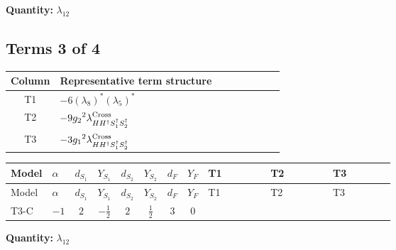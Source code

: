\documentclass[8pt]{article}
\begin{document}
\begin{landscape}
\begin{longtable}{@{}llcccccc >{\raggedright\arraybackslash}p{0.21\linewidth} >{\raggedright\arraybackslash}p{0.21\linewidth} >{\raggedright\arraybackslash}p{0.21\linewidth}@{}}
\midrule
\bottomrule
\end{longtable}
\clearpage
\noindent\textbf{Quantity: }$\lambda_{12}$\par\smallskip
\subsection*{Terms 3 of 4}
\begin{center}
\begin{tabular}{@{}c >{\raggedright\arraybackslash}p{0.82\linewidth}@{}}
\toprule
Column & Representative term structure \\
\midrule
T1 & \(\displaystyle -6 \left({\lambda_{8}}\right)^{*} \left({\lambda_5}\right)^{*}\) \\
\midrule
T2 & \(\displaystyle -9 {g_2}^2 {\lambda_{H H^\dagger S_1^\dagger S_2^\dagger}^{\rm Cross}}\) \\
\midrule
T3 & \(\displaystyle -3 {g_1}^2 {\lambda_{H H^\dagger S_1^\dagger S_2^\dagger}^{\rm Cross}}\) \\
\midrule
\bottomrule
\end{tabular}
\end{center}
\smallskip
\tiny
\begin{longtable}{@{}llcccccc >{\raggedright\arraybackslash}p{0.21\linewidth} >{\raggedright\arraybackslash}p{0.21\linewidth} >{\raggedright\arraybackslash}p{0.21\linewidth}@{}}
\toprule
Model & $\alpha$ & $d_{S_1}$ & $Y_{S_1}$ & $d_{S_2}$ & $Y_{S_2}$ & $d_F$ & $Y_F$ & T1 & T2 & T3 \\
\midrule
\endfirsthead
\toprule
Model & $\alpha$ & $d_{S_1}$ & $Y_{S_1}$ & $d_{S_2}$ & $Y_{S_2}$ & $d_F$ & $Y_F$ & T1 & T2 & T3 \\
\midrule
\endhead
T3-C & $-1$ & $2$ & $-\frac{1}{2}$ & $2$ & $\frac{1}{2}$ & $3$ & $0$ & \scriptsize\adjustbox{max width=\linewidth}{$\begin{gathered} -6 \left({\lambda_{8}}\right)^{*} \left({\lambda_5}\right)^{*}\end{gathered}$} & \scriptsize\adjustbox{max width=\linewidth}{$\begin{gathered} -9 {g_2}^2 {\lambda_{H H^\dagger S_1^\dagger S_2^\dagger}^{\rm Cross}}\end{gathered}$} & \scriptsize\adjustbox{max width=\linewidth}{$\begin{gathered} -3 {g_1}^2 {\lambda_{H H^\dagger S_1^\dagger S_2^\dagger}^{\rm Cross}}\end{gathered}$} \\
\midrule
\bottomrule
\end{longtable}
\clearpage
\noindent\textbf{Quantity: }$\lambda_{12}$\par\smallskip

\end{landscape}
\end{document}
